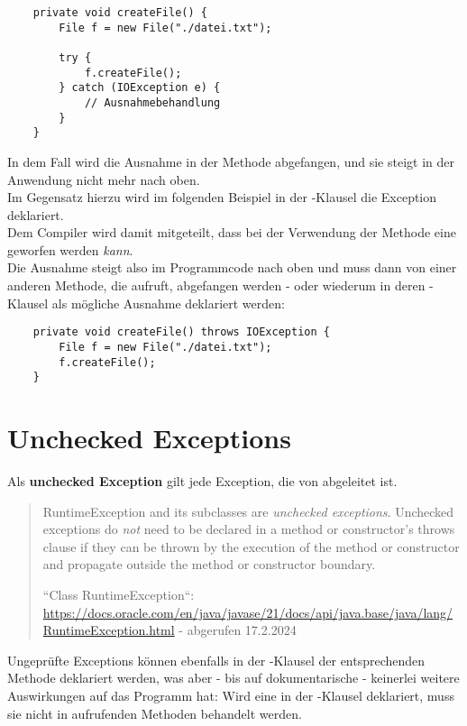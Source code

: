 \begin{verbatim}
    private void createFile() {
        File f = new File("./datei.txt");

        try {
            f.createFile();
        } catch (IOException e) {
            // Ausnahmebehandlung
        }
    }
\end{verbatim}

\noindent
In dem Fall wird die Ausnahme in der Methode abgefangen, und sie steigt in der Anwendung nicht mehr nach oben.\\
Im Gegensatz hierzu wird im folgenden Beispiel in der -Klausel die Exception deklariert.\\
Dem Compiler wird damit mitgeteilt, dass bei der Verwendung der Methode eine  geworfen werden \textit{kann}.\\
Die Ausnahme steigt also im Programmcode nach oben und muss dann von einer anderen Methode, die  aufruft,
abgefangen werden - oder wiederum in deren -Klausel als mögliche Ausnahme deklariert werden:

\begin{verbatim}
    private void createFile() throws IOException {
        File f = new File("./datei.txt");
        f.createFile();
    }
\end{verbatim}

\section{Unchecked Exceptions}

Als \textbf{unchecked Exception} gilt jede Exception, die von  abgeleitet ist.

\blockquote[{``Class RuntimeException``: \url{https://docs.oracle.com/en/java/javase/21/docs/api/java.base/java/lang/RuntimeException.html} - abgerufen 17.2.2024}]{
    RuntimeException and its subclasses are \textit{unchecked exceptions}.
    Unchecked exceptions do \textit{not} need to be declared in a method or constructor's throws clause if they can be thrown by the execution of the method or constructor and propagate outside the method or constructor boundary.
}

\noindent
Ungeprüfte Exceptions können ebenfalls in der -Klausel der entsprechenden Methode deklariert werden, was aber - bis auf dokumentarische - keinerlei weitere Auswirkungen auf das Programm hat: Wird eine  in der -Klausel deklariert, muss sie nicht in aufrufenden Methoden behandelt werden.

